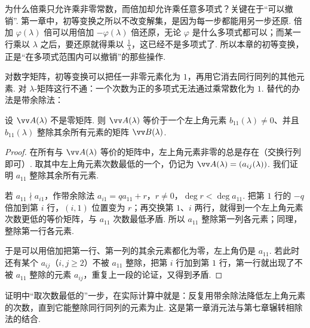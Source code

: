 	\begin{motivebox}
		为什么倍乘只允许乘非零常数，而倍加却允许乘任意多项式？关键在于“可以撤销”. 第一章中，初等变换之所以不改变解集，是因为每一步都能用另一步还原. 倍加 $\varphi(\lambda)$ 倍可以用倍加 $-\varphi(\lambda)$ 倍还原，无论 $\varphi$ 是什么多项式都可以；而某一行乘以 $\lambda$ 之后，要还原就得乘以 $\frac1\lambda$，这已经不是多项式了. 所以本章的初等变换，正是“在多项式范围内可以撤销”的那些操作.
	\end{motivebox}
	
	对数字矩阵，初等变换可以把任一非零元素化为 $1$，再用它消去同行同列的其他元素. 对 $\lambda$-矩阵这行不通：一个次数为正的多项式无法通过乘常数化为 $1$. 替代的办法是带余除法：
	
	\begin{lemma}\label{lem:smithstep}
		设 $\vv A(\lambda)$ 不是零矩阵. 则 $\vv A(\lambda)$ 等价于一个左上角元素 $b_{11}(\lambda)\ne0$、并且 $b_{11}(\lambda)$ 整除其余所有元素的矩阵 $\vv B(\lambda)$.
	\end{lemma}
	\begin{proof}
		在所有与 $\vv A(\lambda)$ 等价的矩阵中，左上角元素非零的总是存在（交换行列即可）. 取其中左上角元素次数最低的一个，仍记为 $\vv A(\lambda)=(a_{ij}(\lambda))$. 我们证明 $a_{11}$ 整除其余所有元素.
		
		若 $a_{11}\nmid a_{i1}$，作带余除法 $a_{i1}=qa_{11}+r$，$r\ne0$，$\deg r<\deg a_{11}$. 把第 $1$ 行的 $-q$ 倍加到第 $i$ 行，$(i,1)$ 位置变为 $r$；再交换第 $1$、$i$ 两行，就得到一个左上角元素次数更低的等价矩阵，与 $a_{11}$ 次数最低矛盾. 所以 $a_{11}$ 整除第一列各元素；同理，整除第一行各元素.
		
		于是可以用倍加把第一行、第一列的其余元素都化为零，左上角仍是 $a_{11}$. 若此时还有某个 $a_{ij}$（$i,j\ge2$）不被 $a_{11}$ 整除，把第 $i$ 行加到第 $1$ 行，第一行就出现了不被 $a_{11}$ 整除的元素 $a_{ij}$，重复上一段的论证，又得到矛盾.
	\end{proof}
	
	证明中“取次数最低的”一步，在实际计算中就是：反复用带余除法降低左上角元素的次数，直到它能整除同行同列的元素为止. 这是第一章消元法与第七章辗转相除法的结合.
	
